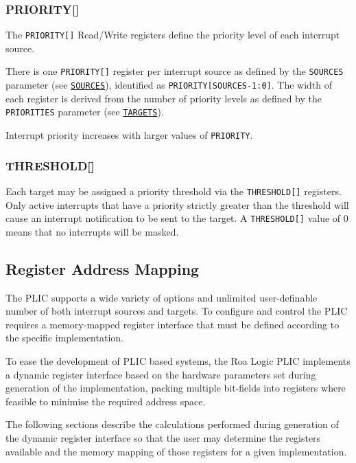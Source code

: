 \subsubsection{PRIORITY[]}

The \texttt{PRIORITY[]} Read/Write
registers define the priority level of each interrupt source.

There is one \texttt{PRIORITY[]}
register per interrupt source as defined by the \texttt{SOURCES}
parameter (see \protect\hyperlink{SOURCES}{\texttt{SOURCES}}), identified as
\texttt{PRIORITY[SOURCES-1:0]}. The
width of each register is derived from the number of priority levels as
defined by the \texttt{PRIORITIES} parameter (see
\protect\hyperlink{TARGETS}{\texttt{TARGETS}}).

Interrupt priority increases with larger values of \texttt{PRIORITY}.

\subsubsection{THRESHOLD[]}

Each target may be assigned a priority threshold via the
\texttt{THRESHOLD[]} registers. Only
active interrupts that have a priority strictly greater than the
threshold will cause an interrupt notification to be sent to the target.
A \texttt{THRESHOLD[]} value of 0
means that no interrupts will be masked.

\subsection{Register Address Mapping}

The PLIC supports a wide variety of options and unlimited user-definable
number of both interrupt sources and targets. To configure and control
the PLIC requires a memory-mapped register interface that must be
defined according to the specific implementation.

To ease the development of PLIC based systems, the Roa Logic PLIC
implements a dynamic register interface based on the hardware parameters
set during generation of the implementation, packing multiple bit-fields
into registers where feasible to minimise the required address space.

The following sections describe the calculations performed during
generation of the dynamic register interface so that the user may
determine the registers available and the memory mapping of those
registers for a given implementation.

